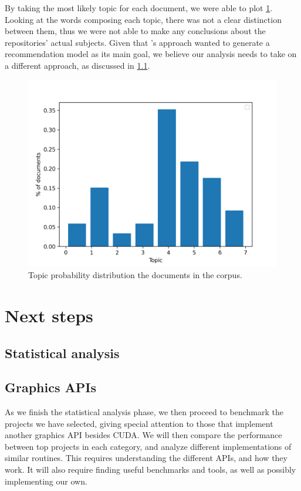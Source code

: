 \documentclass[conference, onecolumn]{IEEEtran}
\begin{document}
By taking the most likely topic for each document, we were able to plot
\cref{fig:topic-probabilities}.
Looking at the words composing each topic, there was not a clear distinction
between them, thus we were not able to make any conclusions about the
repositories' actual subjects.
Given that \cite{zheng2018measuring}'s approach wanted to generate a
recommendation model as its main goal, we believe our analysis needs to take on
a different approach, as discussed in \cref{sec:next-steps:statistics}.

\begin{figure}[H]
    \centering
    \includegraphics[width=0.7\linewidth]{topic-probabilities.png}
    \caption{Topic probability distribution the documents in the corpus.}
    \label{fig:topic-probabilities}
\end{figure}

\section{Next steps} \label{sec:next-steps}

\subsection{Statistical analysis} \label{sec:next-steps:statistics}


\subsection{Graphics APIs} \label{sec:next-steps-apis}

As we finish the statistical analysis phase, we then proceed to benchmark the
projects we have selected, giving special attention to those that implement
another graphics API besides CUDA.
We will then compare the performance between top projects in each category, and
analyze different implementations of similar routines.
This requires understanding the different APIs, and how they work.
It will also require finding useful benchmarks and tools, as well as possibly
implementing our own.
\end{document}

